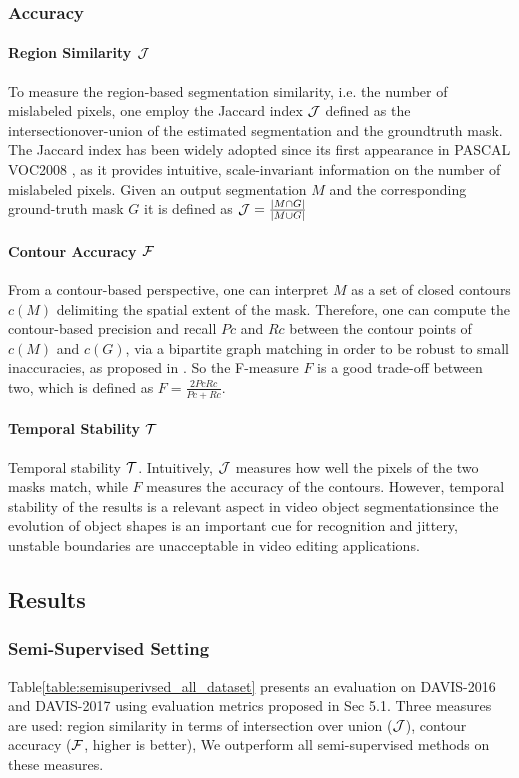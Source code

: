 \subsubsection{Accuracy}
\paragraph{Region Similarity $\mathcal{J}$}
To measure the region-based segmentation similarity, i.e. the number of mislabeled pixels,
one employ the Jaccard index $\mathcal{J}$ defined as the intersectionover-union of the estimated segmentation and the groundtruth mask.
The Jaccard index has been widely adopted since its first appearance in PASCAL VOC2008 \cite{martin2004learning}, 
as it provides intuitive, scale-invariant information on the number of mislabeled pixels. Given an output segmentation $M$ and 
the corresponding ground-truth mask $G$ it is defined as $\mathcal{J} = \frac{|M \cap G|}{|M\cup G|}$

\paragraph{Contour Accuracy $\mathcal{F}$}
From a contour-based perspective, one can interpret $M$ as a set of closed contours $c(M)$
delimiting the spatial extent of the mask. Therefore, one
can compute the contour-based precision and recall $Pc$ and
$Rc$ between the contour points of $c(M)$ and $c(G)$, via a bipartite graph matching in order to be robust to small inaccuracies,
as proposed in \cite{martin2004learning}.
So the F-measure $F$ is a good trade-off between two, which is  defined as $F = \frac{2Pc Rc}{Pc+Rc}$.

\paragraph{Temporal Stability $\mathcal{T}$}
Temporal stability $\mathcal{T}$. Intuitively, $\mathcal{J}$ measures how well the pixels of the two masks match, while $F$ measures the
accuracy of the contours. However, temporal stability of the results is a relevant aspect in video object segmentationsince the evolution of object shapes is an important cue for
recognition and jittery, unstable boundaries are unacceptable in video editing applications. 



\subsection{Results}
\subsubsection{Semi-Supervised Setting}
Table\ref{table:semisuperivsed_all_dataset} presents an evaluation on DAVIS-2016 and DAVIS-2017  using evaluation metrics proposed in Sec 5.1. Three measures are used: region similarity in terms of intersection over union ($\mathcal{J}$), contour accuracy ($\mathcal{F}$, higher is better), We outperform all semi-supervised methods on these measures.

